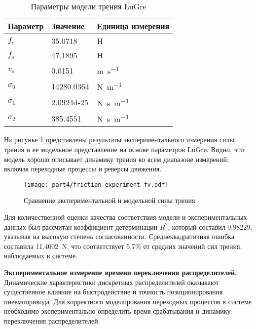 \begin{table}[ht]
	\caption{Параметры модели трения LuGre}
	\label{tab:lugre_params}
	\centering
	\small
	\begin{tabular}{lll}
		\hline
		\textbf{Параметр} & \textbf{Значение} & \textbf{Единица измерения}    \\
		\hline
		$f_c$             & \num{35.0718}     & Н                             \\
		$f_s$             & \num{47.1895}     & Н                             \\
		$v_s$             & \num{0.0151}      & \si{\metre\per\second}        \\
		$\sigma_0$        & \num{14280.0364}  & \si{\newton\per\metre}        \\
		$\sigma_1$        & \num{2.0924d-25}  & \si{\newton\second\per\metre} \\
		$\sigma_2$        & \num{385.4551}    & \si{\newton\second\per\metre} \\
		\hline
	\end{tabular}
\end{table}

На рисунке \ref{fig:friction_force} представлены результаты экспериментального измерения силы трения и ее модельное
представление на основе параметров LuGre. Видно, что модель хорошо описывает динамику трения во всем диапазоне
измерений, включая переходные процессы и реверсы движения.

\begin{figure}[ht]
	\centering
	\texttt{[image: part4/friction\_experiment\_fv.pdf]}
	\caption{Сравнение экспериментальной и модельной силы трения}\label{fig:friction_force}
\end{figure}

Для количественной оценки качества соответствия модели и экспериментальных данных был рассчитан коэффициент детерминации
$R^2$, который составил \num{0.98229}, указывая на высокую степень согласованности. Среднеквадратичная ошибка составила
\num{11.4002}~\si{\newton}, что соответствует \num{5.7}\% от средних значений сил трения, наблюдаемых в системе.

\textbf{Экспериментальное измерение времени переключения распределителей.}
Динамические характеристики дискретных распределителей оказывают существенное влияние на быстродействие
и точность позиционирования пневмопривода. Для корректного моделирования переходных процессов в
системе необходимо экспериментально определить время срабатывания и динамику переключения распределителей.

